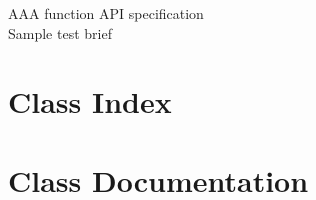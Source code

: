 \documentclass[twoside,openany]{book}
\newcommand{\+}{\discretionary{\mbox{\scriptsize$\hookleftarrow$}}{}{}}
\newcommand{\clearemptydoublepage}{%
  }
\begin{document}
  \raggedbottom
    \hypersetup{pageanchor=false,
                bookmarksnumbered=true,
                pdfencoding=unicode
               }
  \begin{titlepage}
  \vspace*{7cm}
  \begin{center}%
  {\fontsize{28pt}{34pt}\selectfont AAA function API specification}\\
  \vspace*{1cm}
  {\large Sample test brief}\\
  \end{center}
  \end{titlepage}
  \clearemptydoublepage
  \tableofcontents
  \clearemptydoublepage
  \hypersetup{pageanchor=true}
\chapter{Class Index}

\chapter{Class Documentation}





  \backmatter
  \newpage
  \clearemptydoublepage
  \printindex
\end{document}

